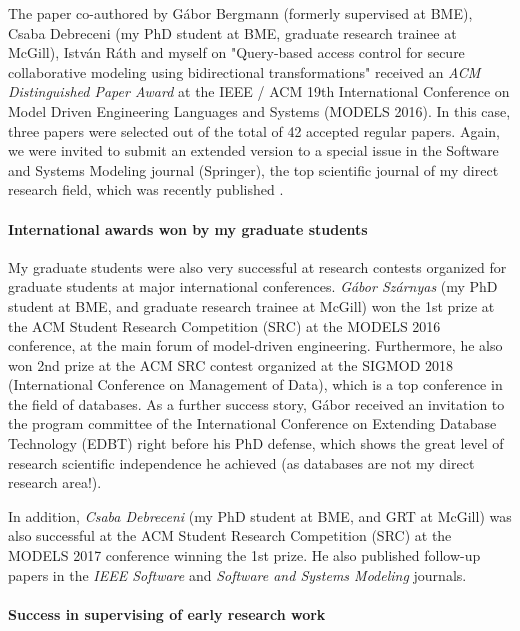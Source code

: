 The paper co-authored by Gábor Bergmann (formerly supervised at BME), Csaba Debreceni (my PhD student at BME, graduate research trainee at McGill), István Ráth and myself on "Query-based access control for secure collaborative modeling using bidirectional transformations" \cite{MODELS2016-access} received an \emph{ACM Distinguished Paper Award} at the IEEE / ACM 19th International Conference on Model Driven Engineering Languages and Systems (MODELS 2016). In this case, three papers were selected out of the total of 42 accepted regular papers. Again, we were invited to submit an extended version to a special issue in the Software and Systems Modeling journal (Springer), the top scientific journal of my direct research field, which was recently published \cite{sosym2017-mondo}.


\paragraph{International awards won by my graduate students}

My graduate students were also very successful at research contests organized for graduate students at major international conferences.  \emph{Gábor Szárnyas} (my PhD student at BME,  and graduate research trainee at McGill) won the 1st prize at the ACM Student Research Competition (SRC) at the MODELS 2016 conference, at the main forum of model-driven engineering. Furthermore, he also won 2nd prize at the ACM SRC contest organized at the SIGMOD 2018 (International Conference on Management of Data), which is a top conference in the field of databases. As a further success story, Gábor received an invitation to the program committee of the International Conference on Extending Database Technology (EDBT) right before his PhD defense, which shows the great level of research scientific independence he achieved (as databases are not my direct research area!). 

In addition, \emph{Csaba Debreceni} (my PhD student at BME,  and GRT at McGill) was also successful at the ACM Student Research Competition (SRC) at the MODELS 2017 conference winning the 1st prize. He also published follow-up papers in the \emph{IEEE Software} and \emph{Software and Systems Modeling} journals. 


\paragraph{Success in supervising of early research work}

